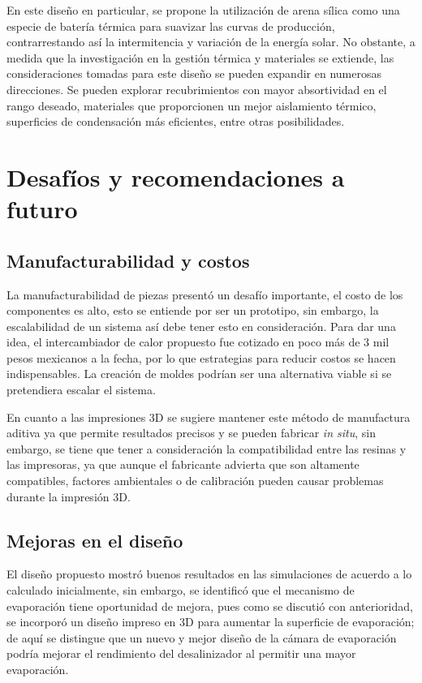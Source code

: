 		En este diseño en particular, se propone la utilización de arena sílica como una especie de batería térmica para suavizar las curvas de producción, contrarrestando así la intermitencia y variación de la energía solar. No obstante, a medida que la investigación en la gestión térmica y materiales se extiende, las consideraciones tomadas para este diseño se pueden expandir en numerosas direcciones. Se pueden explorar recubrimientos con mayor absortividad en el rango deseado, materiales que proporcionen un mejor aislamiento térmico, superficies de condensación más eficientes, entre otras posibilidades.
	
	\section{Desafíos y recomendaciones a futuro}
		
		\subsection{Manufacturabilidad y costos}
			
			La manufacturabilidad de piezas presentó un desafío importante, el costo de los componentes es alto, esto se entiende por ser un prototipo, sin embargo, la escalabilidad de un sistema así debe tener esto en consideración. Para dar una idea, el intercambiador de calor propuesto fue cotizado en poco más de 3 mil pesos mexicanos a la fecha, por lo que estrategias para reducir costos se hacen indispensables. La creación de moldes podrían ser una alternativa viable si se pretendiera escalar el sistema.
		
			En cuanto a las impresiones 3D se sugiere mantener este método de manufactura aditiva ya que permite resultados precisos y se pueden fabricar \textit{in situ}, sin embargo, se tiene que tener a consideración la compatibilidad entre las resinas y las impresoras, ya que aunque el fabricante advierta que son altamente compatibles, factores ambientales o de calibración pueden causar problemas durante la impresión 3D.
			
		
		\subsection{Mejoras en el diseño}
		
			El diseño propuesto mostró buenos resultados en las simulaciones de acuerdo a lo calculado inicialmente, sin embargo, se identificó que el mecanismo de evaporación tiene oportunidad de mejora, pues como se discutió con anterioridad, se incorporó un diseño impreso en 3D para aumentar la superficie de evaporación; de aquí se distingue que un nuevo y mejor diseño de la cámara de evaporación podría mejorar el rendimiento del desalinizador al permitir una mayor evaporación.
		
